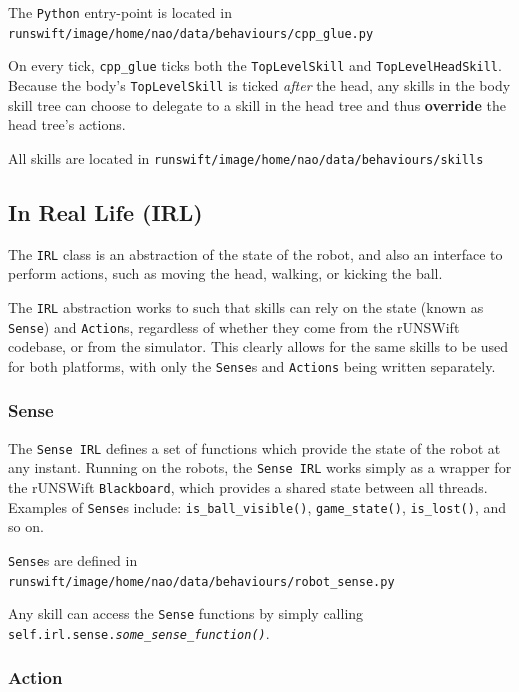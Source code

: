 The \verb!Python! entry-point is located in \texttt{runswift/image/home/nao/data/behaviours/cpp\_glue.py}

On every tick, \texttt{cpp\_glue} ticks both the \texttt{TopLevelSkill} and \texttt{TopLevelHeadSkill}. Because the body's \texttt{TopLevelSkill} is ticked \textit{after} the head, any skills in the body skill tree can choose to delegate to a skill in the head tree and thus \textbf{override} the head tree's actions.

All skills are located in \texttt{runswift/image/home/nao/data/behaviours/skills}

\subsection{In Real Life (IRL)}

The \texttt{IRL} class is an abstraction of the state of the robot, and also an interface to perform actions, such as moving the head, walking, or kicking the ball.

The \texttt{IRL} abstraction works to such that skills can rely on the state (known as \texttt{Sense}) and \texttt{Action}s, regardless of whether they come from the rUNSWift codebase, or from the simulator.\cite{simulator} This clearly allows for the same skills to be used for both platforms, with only the \texttt{Sense}s and \texttt{Actions} being written separately.

\subsubsection{Sense}

The \texttt{Sense IRL} defines a set of functions which provide the state of the robot at any instant. Running on the robots, the \texttt{Sense IRL} works simply as a wrapper for the rUNSWift \texttt{Blackboard}, which provides a shared state between all threads. Examples of \texttt{Sense}s include: \texttt{is\_ball\_visible()}, \texttt{game\_state()}, \texttt{is\_lost()}, and so on.

\texttt{Sense}s are defined in \texttt{runswift/image/home/nao/data/behaviours/robot\_sense.py}

Any skill can access the \texttt{Sense} functions by simply calling \texttt{self.irl.sense.\textit{some\_sense\_function()}}.

\subsubsection{Action}

